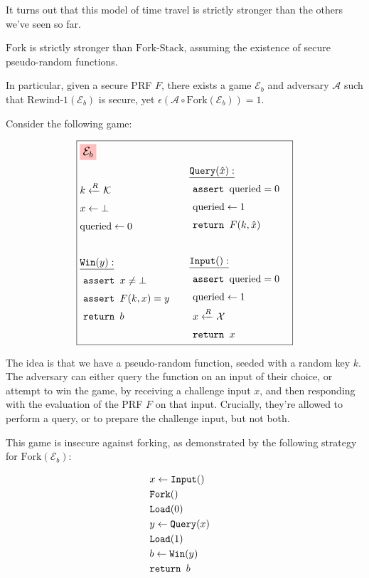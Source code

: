 It turns out that this model of time travel is strictly stronger than the
others we've seen so far.

\begin{claim}
    \label{claim:fork-is-strong}
    $\text{Fork}$ is strictly stronger than $\text{Fork-Stack}$,
    assuming the existence of secure pseudo-random functions.

    In particular, given a secure PRF $F$, there exists a game $\mathcal{E}_b$ and adversary $\mathcal{A}$ such that 
    $\text{Rewind-1}(\mathcal{E}_b)$ is secure, yet $\epsilon(\mathcal{A} \circ \text{Fork}(\mathcal{E}_b)) = 1$.
\end{claim}

Consider the following game:

$$
\boxed{
\begin{aligned}
&\colorbox{pink}{\large $\mathcal{E}_b$}\cr
&\begin{aligned}
    &k \xleftarrow{R} \mathcal{K}\cr
    &x \gets \bot\cr
    &\text{queried} \gets 0\cr
    &\cr
    &\underline{\texttt{Win}(y):}\cr
    &\ \texttt{assert } x \neq \bot\cr
    &\ \texttt{assert } F(k, x) = y\cr
    &\ \texttt{return } b\cr
\end{aligned}
&\begin{aligned}
    &\underline{\texttt{Query}(\hat{x}):}\cr
    &\ \texttt{assert } \text{queried} = 0\cr
    &\ \text{queried} \gets 1\cr
    &\ \texttt{return } F(k, \hat{x})\cr
    &\cr
    &\underline{\texttt{Input}():}\cr
    &\ \texttt{assert } \text{queried} = 0\cr
    &\ \text{queried} \gets 1\cr
    &\ x \xleftarrow{R} \mathcal{X}\cr
    &\ \texttt{return } x\cr
\end{aligned}\cr
\end{aligned}
}
$$

The idea is that we have a pseudo-random function, seeded with
a random key $k$.
The adversary can either query the function on an input of their choice,
or attempt to win the game, by receiving a challenge input $x$,
and then responding with the evaluation of the PRF $F$ on that input.
Crucially, they're allowed to perform a query, or to prepare
the challenge input, but not both.

This game is insecure against forking, as demonstrated by the following
strategy for $\text{Fork}(\mathcal{E}_b)$:

$$
\begin{aligned}
&x \gets \texttt{Input}()\cr
&\texttt{Fork}()\cr
&\texttt{Load}(0)\cr
&y \gets \texttt{Query}(x)\cr
&\texttt{Load}(1)\cr
&b \gets \texttt{Win}(y)\cr
&\texttt{return } b
\end{aligned}
$$

